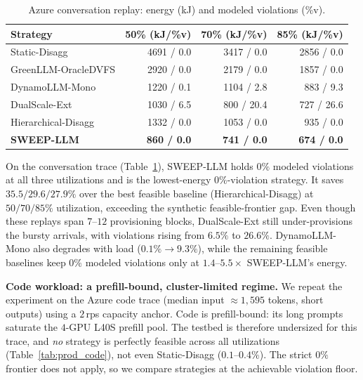 \begin{table}[t]
\centering
\caption{Azure conversation replay: energy (kJ) and modeled violations (\%v).}
\label{tab:prod_conv}
\small
\setlength{\tabcolsep}{5pt}
\begin{tabular}{@{}lrrr@{}}
\toprule
Strategy & 50\% (kJ/\%v) & 70\% (kJ/\%v) & 85\% (kJ/\%v) \\
\midrule
Static-Disagg        & 4691 / 0.0 & 3417 / 0.0 & 2856 / 0.0 \\
GreenLLM-OracleDVFS  & 2920 / 0.0 & 2179 / 0.0 & 1857 / 0.0 \\
DynamoLLM-Mono       & 1220 / 0.1 & 1104 / 2.8 & 883 / 9.3 \\
DualScale-Ext        & 1030 / 6.5 & 800 / 20.4 & 727 / 26.6 \\
Hierarchical-Disagg  & 1332 / 0.0 & 1053 / 0.0 & 935 / 0.0 \\
\textbf{SWEEP-LLM}   & \textbf{860 / 0.0} & \textbf{741 / 0.0} & \textbf{674 / 0.0} \\
\bottomrule
\end{tabular}
\end{table}

On the conversation trace (Table~\ref{tab:prod_conv}), SWEEP-LLM holds $0\%$ modeled violations at all three utilizations and is the lowest-energy $0\%$-violation strategy.
It saves $35.5/29.6/27.9\%$ over the best feasible baseline (Hierarchical-Disagg) at $50/70/85\%$ utilization, exceeding the synthetic feasible-frontier gap.
Even though these replays span $7$--$12$ provisioning blocks, DualScale-Ext still under-provisions the bursty arrivals, with violations rising from $6.5\%$ to $26.6\%$.
DynamoLLM-Mono also degrades with load ($0.1\%{\to}9.3\%$), while the remaining feasible baselines keep $0\%$ modeled violations only at $1.4$--$5.5\times$ SWEEP-LLM's energy.

\textbf{Code workload: a prefill-bound, cluster-limited regime.}
We repeat the experiment on the Azure code trace (median input $\approx$$1{,}595$ tokens, short outputs) using a $2$\,rps capacity anchor.
Code is prefill-bound: its long prompts saturate the $4$-GPU L40S prefill pool.
The testbed is therefore undersized for this trace, and \emph{no} strategy is perfectly feasible across all utilizations (Table~\ref{tab:prod_code}), not even Static-Disagg ($0.1$--$0.4\%$).
The strict $0\%$ frontier does not apply, so we compare strategies at the achievable violation floor.

